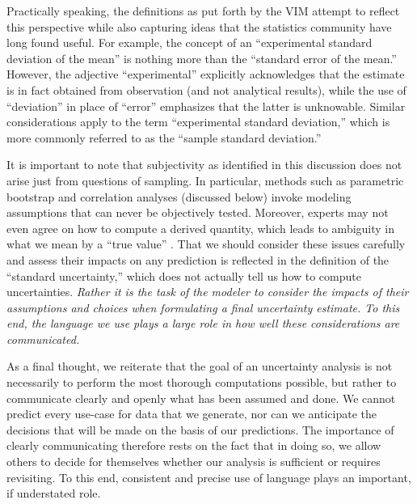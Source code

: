 Practically speaking, the definitions as put forth by the VIM attempt to reflect this perspective while also capturing ideas that the statistics community have long found useful.  For example, the concept of an ``experimental standard deviation of the mean'' is nothing more than the ``standard error of the mean.''  However, the adjective ``experimental'' explicitly acknowledges that the estimate is in fact obtained from observation (and not analytical results), while the use of ``deviation'' in place of ``error'' emphasizes that the latter is unknowable.  Similar considerations apply to the term ``experimental standard deviation,'' which is more commonly referred to as the ``sample standard deviation.''

It is important to note that subjectivity as identified in this discussion does not arise just from questions of sampling. In particular, methods such as parametric bootstrap and correlation analyses (discussed below) invoke modeling assumptions that can never be objectively tested.  Moreover, experts may not even agree on how to compute a derived quantity, which leads to ambiguity in what we mean by a ``true value'' \cite{patrone1}.  That we should consider these issues carefully and assess their impacts on any prediction is reflected in the definition of the ``standard uncertainty,'' which does not actually tell us how to compute uncertainties.  {\it Rather it is the task of the modeler to consider the impacts of their assumptions and choices when formulating a final uncertainty estimate.  To this end, the language we use plays a large role in how well these considerations are communicated.}

As a final thought, we reiterate that the goal of an uncertainty analysis is not necessarily to perform the most thorough computations possible, but rather to communicate clearly and openly what has been assumed and done.  We cannot predict every use-case for data that we generate, nor can we anticipate the decisions that will be made on the basis of our predictions.  The importance of clearly communicating therefore rests on the fact that in doing so, we allow others to decide for themselves whether our analysis is sufficient or requires revisiting.  To this end, consistent and precise use of language plays an important, if understated role.
